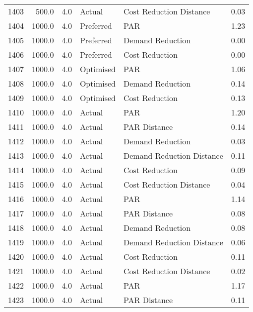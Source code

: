 \begin{longtable}{lrrllr}
1403 &        500.0 &     4.0 &         Actual &    Cost Reduction Distance &   0.03 \\
1404 &       1000.0 &     4.0 &      Preferred &                        PAR &   1.23 \\
1405 &       1000.0 &     4.0 &      Preferred &           Demand Reduction &   0.00 \\
1406 &       1000.0 &     4.0 &      Preferred &             Cost Reduction &   0.00 \\
1407 &       1000.0 &     4.0 &      Optimised &                        PAR &   1.06 \\
1408 &       1000.0 &     4.0 &      Optimised &           Demand Reduction &   0.14 \\
1409 &       1000.0 &     4.0 &      Optimised &             Cost Reduction &   0.13 \\
1410 &       1000.0 &     4.0 &         Actual &                        PAR &   1.20 \\
1411 &       1000.0 &     4.0 &         Actual &               PAR Distance &   0.14 \\
1412 &       1000.0 &     4.0 &         Actual &           Demand Reduction &   0.03 \\
1413 &       1000.0 &     4.0 &         Actual &  Demand Reduction Distance &   0.11 \\
1414 &       1000.0 &     4.0 &         Actual &             Cost Reduction &   0.09 \\
1415 &       1000.0 &     4.0 &         Actual &    Cost Reduction Distance &   0.04 \\
1416 &       1000.0 &     4.0 &         Actual &                        PAR &   1.14 \\
1417 &       1000.0 &     4.0 &         Actual &               PAR Distance &   0.08 \\
1418 &       1000.0 &     4.0 &         Actual &           Demand Reduction &   0.08 \\
1419 &       1000.0 &     4.0 &         Actual &  Demand Reduction Distance &   0.06 \\
1420 &       1000.0 &     4.0 &         Actual &             Cost Reduction &   0.11 \\
1421 &       1000.0 &     4.0 &         Actual &    Cost Reduction Distance &   0.02 \\
1422 &       1000.0 &     4.0 &         Actual &                        PAR &   1.17 \\
1423 &       1000.0 &     4.0 &         Actual &               PAR Distance &   0.11 \\

\end{longtable}
